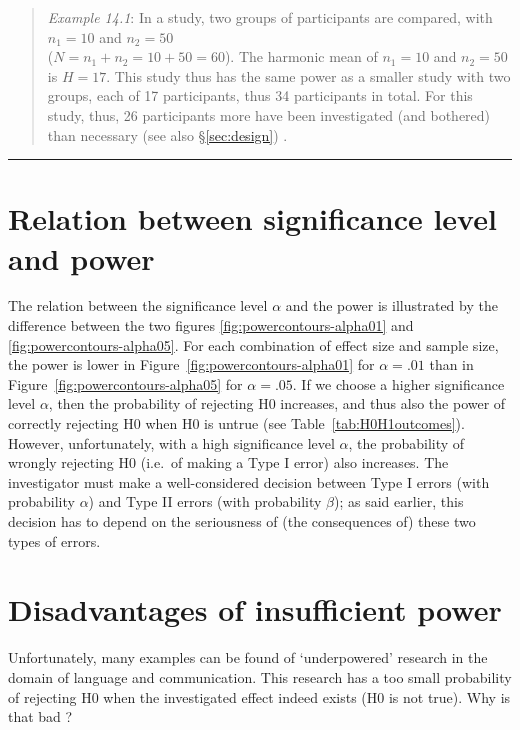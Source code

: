 \documentclass[
]{book}
\begin{document}
\begin{quote}
\emph{Example 14.1}: In a study, two groups of participants are compared, with \(n_1=10\) and \(n_2=50\)\\
(\(N=n_1+n_2=10+50=60\)). The harmonic mean of \(n_1=10\) and \(n_2=50\) is \(H=17\). This study thus has the same
power as a smaller study with two groups, each of 17 participants, thus 34 participants in total. For this
study, thus, 26 participants more have been investigated (and bothered)
than necessary (see also §\ref{sec:design}) \citep[p.295]{ACA11}.
\end{quote}

\begin{center}\rule{0.5\linewidth}{0.5pt}\end{center}

\hypertarget{sec:significancelevel-power}{%
\section{Relation between significance level and power}\label{sec:significancelevel-power}}

The relation between the significance level \(\alpha\) and the power is
illustrated by the difference between the two figures
\ref{fig:powercontours-alpha01} and
\ref{fig:powercontours-alpha05}. For each combination of effect size
and sample size, the power is lower in
Figure~\ref{fig:powercontours-alpha01} for \(\alpha=.01\) than in
Figure~\ref{fig:powercontours-alpha05} for \(\alpha=.05\). If we choose a higher
significance level \(\alpha\), then the probability of rejecting H0
increases, and thus also the power of correctly rejecting H0 when H0
is untrue (see Table~\ref{tab:H0H1outcomes}).
However, unfortunately, with a high significance
level \(\alpha\), the probability of wrongly rejecting H0 (i.e.~of making a
Type I error) also increases. The investigator
must make a well-considered decision between Type I errors (with
probability \(\alpha\)) and Type II errors (with probability \(\beta\)); as said earlier,
this decision has to depend on the seriousness of (the consequences of) these
two types of errors.

\hypertarget{disadvantages-of-insufficient-power}{%
\section{Disadvantages of insufficient power}\label{disadvantages-of-insufficient-power}}

Unfortunately, many examples can be found of `underpowered' research
in the domain of language and communication. This research has a too small
probability of rejecting H0 when the investigated effect indeed
exists (H0 is not true). Why is that bad \citep{Quene10}?
\end{document}
